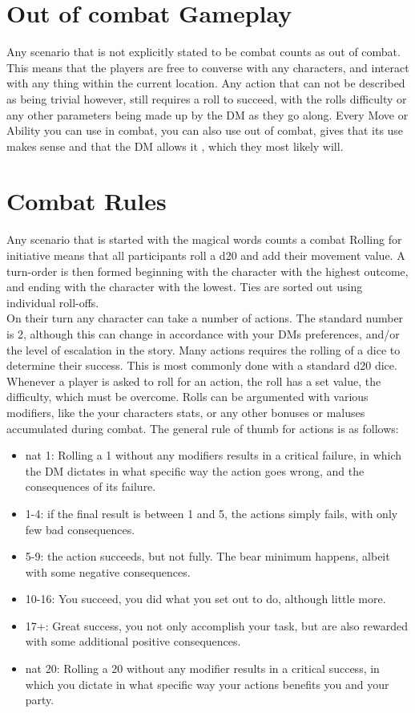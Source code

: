 \documentclass[a4paper,11pt]{article}
\begin{document}
\section{Out of combat Gameplay} 
Any scenario that is not explicitly stated to be combat counts as out of combat. This means that the players are free to converse with any characters, and interact with any thing within the current location. Any action that can not be described as being trivial however, still requires a roll to succeed, with the rolls difficulty or any other parameters being made up by the DM as they go along. Every Move or Ability you can use in combat, you can also use out of combat, gives that its use makes sense and that the DM allows it , which they most likely will.

\section{Combat Rules}
Any scenario that is started with the magical words  counts a combat Rolling for initiative means that all participants roll a d20 and add their movement value. A turn-order is then formed beginning with the character with the highest outcome, and ending with the character with the lowest. Ties are sorted out using individual roll-offs.\\
On their turn any character can take a number of actions. The standard number is 2, although this can change in accordance with your DMs preferences, and/or the level of escalation in the story. Many actions requires the rolling of a dice to determine their success. This is most commonly done with a standard d20 dice. Whenever a player is asked to roll for an action, the roll has a set value, the difficulty, which must be overcome. Rolls can be argumented with various modifiers, like the your characters stats, or any other bonuses or maluses accumulated during combat. The general rule of thumb for  actions is as follows:
\begin{itemize}
	\item nat 1: Rolling a 1 without any modifiers results in a critical failure, in which the DM dictates in what specific way the action goes wrong, and the consequences of its failure.
	\item 1-4: if the final result is between 1 and 5, the actions simply fails, with only few bad consequences.
	\item 5-9: the action succeeds, but not fully. The bear minimum happens, albeit with some negative consequences.
	\item 10-16: You succeed, you did what you set out to do, although little more.
	\item 17+: Great success, you not only accomplish your task, but are also rewarded with some additional positive consequences.
	\item nat 20: Rolling a 20 without any modifier results in a critical success, in which you dictate in what specific way your actions benefits you and your party.
\end{itemize}
\end{document}
